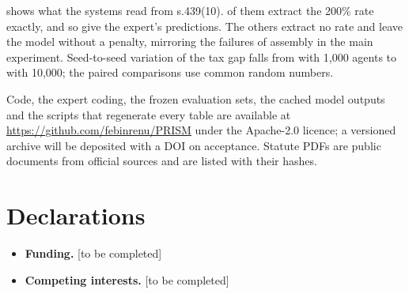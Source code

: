 \documentclass[sn-apa]{sn-jnl}
\begin{document}
\begin{appendices}
 shows what the systems read from s.439(10).
 of them extract the 200\% rate exactly, and so give the
expert's predictions. The others extract no rate and leave the model
without a penalty, mirroring the failures of assembly in the main
experiment. Seed-to-seed variation of the tax gap falls from
 with 1,000 agents to  with 10,000; the
paired comparisons use common random numbers.




\end{appendices}

\backmatter

Code, the expert coding, the frozen evaluation sets, the cached model
outputs and the scripts that regenerate every table are available at
\url{https://github.com/febinrenu/PRISM} under the Apache-2.0 licence; a
versioned archive will be deposited with a DOI on acceptance. Statute PDFs
are public documents from official sources and are listed with their
hashes.

\section*{Declarations}
\begin{itemize}
  \item \textbf{Funding.} [to be completed]
  \item \textbf{Competing interests.} [to be completed]
\end{itemize}


\end{document}
